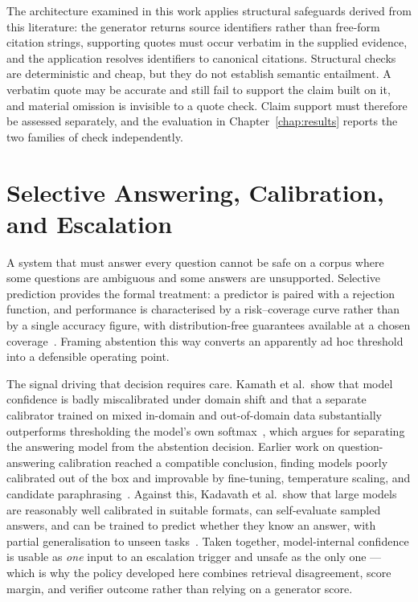 The architecture examined in this work applies structural safeguards derived from this literature: the generator returns source identifiers rather than free-form citation strings, supporting quotes must occur verbatim in the supplied evidence, and the application resolves identifiers to canonical citations. Structural checks are deterministic and cheap, but they do not establish semantic entailment. A verbatim quote may be accurate and still fail to support the claim built on it, and material omission is invisible to a quote check. Claim support must therefore be assessed separately, and the evaluation in Chapter~\ref{chap:results} reports the two families of check independently.

\section{Selective Answering, Calibration, and Escalation}
\label{sec:sota-selective}

A system that must answer every question cannot be safe on a corpus where some questions are ambiguous and some answers are unsupported. Selective prediction provides the formal treatment: a predictor is paired with a rejection function, and performance is characterised by a risk--coverage curve rather than by a single accuracy figure, with distribution-free guarantees available at a chosen coverage~\cite{geifman2017selective}. Framing abstention this way converts an apparently ad hoc threshold into a defensible operating point.

The signal driving that decision requires care. Kamath et al.\ show that model confidence is badly miscalibrated under domain shift and that a separate calibrator trained on mixed in-domain and out-of-domain data substantially outperforms thresholding the model's own softmax~\cite{kamath2020selective}, which argues for separating the answering model from the abstention decision. Earlier work on question-answering calibration reached a compatible conclusion, finding models poorly calibrated out of the box and improvable by fine-tuning, temperature scaling, and candidate paraphrasing~\cite{jiang2021calibration}. Against this, Kadavath et al.\ show that large models are reasonably well calibrated in suitable formats, can self-evaluate sampled answers, and can be trained to predict whether they know an answer, with partial generalisation to unseen tasks~\cite{kadavath2022know}. Taken together, model-internal confidence is usable as \emph{one} input to an escalation trigger and unsafe as the only one --- which is why the policy developed here combines retrieval disagreement, score margin, and verifier outcome rather than relying on a generator score.

